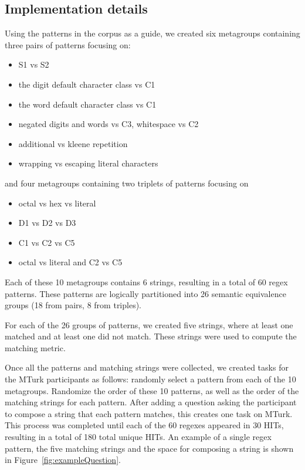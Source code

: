 \subsection{Implementation details}

Using the patterns in the corpus as a guide, we created six metagroups containing three pairs of patterns focusing on:
\begin{itemize}
\item S1 vs S2
\item the digit default character class vs C1
\item the word default character class vs C1
\item negated digits and words vs C3, whitespace vs C2
\item additional vs kleene repetition
\item wrapping vs escaping literal characters
\end{itemize}
and four metagroups containing two triplets of patterns focusing on
\begin{itemize}
\item octal vs hex vs literal
\item D1 vs D2 vs D3
\item C1 vs C2 vs C5
\item octal vs literal and C2 vs C5
\end{itemize}

Each of these 10 metagroups contains 6 strings, resulting in a total of 60 regex patterns.  These patterns are logically partitioned into 26 semantic equivalence groups (18 from pairs, 8 from triples).

For each of the 26 groups of patterns, we created five strings, where at least one matched and at least one did not match. These strings were used to compute the matching metric.

Once all the patterns and matching strings were collected, we created tasks for the MTurk participants as follows:
randomly select a pattern from each of the 10 metagroups. Randomize the order of these 10 patterns, as well as the order of the matching strings for each pattern. After adding a question asking the participant to compose a string that each pattern matches, this creates one task on MTurk.   This process was completed until each of the 60 regexes appeared in 30 HITs, resulting in a total of 180 total unique HITs.
An example of a single regex pattern, the five matching strings and the space for composing a string is shown in Figure~\ref{fig:exampleQuestion}.

